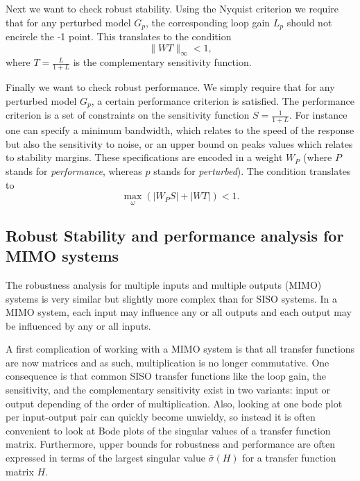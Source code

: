 \documentclass[12pt,lot, lof]{puthesis}
\begin{document}
Next we want to check robust stability. Using the Nyquist criterion we require that for any perturbed model $G_p$, the corresponding loop gain $L_p$ should not encircle the -1 point. 
This translates to the condition
\begin{equation}
	\| W T \|_\infty < 1,
\end{equation}
where $T = \frac{L}{1 + L}$ is the complementary sensitivity function.

Finally we want to check robust performance. We simply require that for any perturbed model $G_p$, a certain performance criterion is satisfied.
The performance criterion is a set of constraints on the sensitivity function $S = \frac{1}{1 + L}$.
For instance one can specify a minimum bandwidth, which relates to the speed of the response but also the sensitivity to noise, or an upper bound on peaks values which relates to stability margins.
These specifications are encoded in a weight $W_P$ (where $P$ stands for \emph{performance}, whereas $p$ stands for \emph{perturbed}).
The condition translates to
\begin{equation}
	\max_\omega(| W_P S | + | W T |) < 1.
\end{equation}

\subsection{Robust Stability and performance analysis for MIMO systems}

The robustness analysis for multiple inputs and multiple outputs (MIMO) systems is very similar but slightly more complex than for SISO systems. In a MIMO system, each input may influence any or all outputs and each output may be influenced by any or all inputs.

A first complication of working with a MIMO system is that all transfer functions are now matrices and as such, multiplication is no longer commutative.
One consequence is that common SISO transfer functions like the loop gain, the sensitivity, and the complementary sensitivity exist in two variants: input or output depending of the order of multiplication.
Also, looking at one bode plot per input-output pair can quickly become unwieldy, so instead it is often convenient to look at Bode plots of the singular values of a transfer function matrix.
Furthermore, upper bounds for robustness and performance are often expressed in terms of the largest singular value $\bar\sigma(H)$ for a transfer function matrix $H$.
\end{document}
